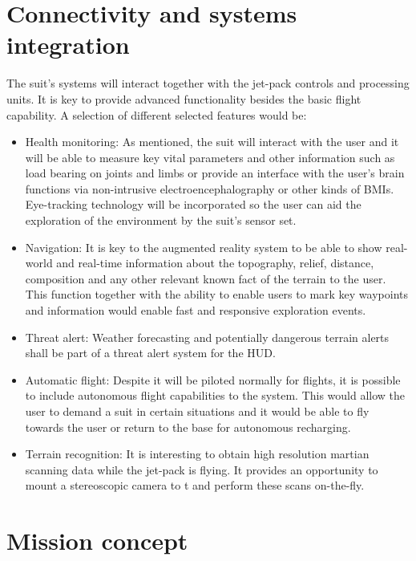 \documentclass[twocolumn]{article}
\begin{document}
\section{Connectivity and systems integration}

The suit's systems will interact together with the jet-pack controls and 
processing units. It is key to provide advanced functionality besides the basic 
flight capability. A selection of different selected features would be:
\begin{itemize}
	\item Health monitoring: As mentioned, the suit will interact with the 
user and it will be able to measure key vital parameters and other information 
such as load bearing on joints and limbs or provide an interface with the 
user's brain functions via non-intrusive electroencephalography or other kinds 
of BMIs. Eye-tracking technology will be incorporated so the user can aid the 
exploration of the environment by the suit's sensor set.
	\item Navigation: It is key to the augmented reality system to be able 
to show real-world and real-time information about the topography, relief, 
distance, composition and any other relevant known fact of the terrain to the 
user. This function together with the ability to enable users to mark key 
waypoints and information would enable fast and responsive exploration events.
	\item Threat alert: Weather forecasting and potentially dangerous 
terrain alerts shall be part of a threat alert system for the HUD.
	\item Automatic flight: Despite it will be piloted normally for 
flights, it is possible to include autonomous flight capabilities to the system. 
This would allow the user to demand a suit in certain situations and it would be 
able to fly towards the user or return to the base for autonomous recharging.
	\item Terrain recognition: It is interesting to obtain high resolution 
martian scanning data while the jet-pack is flying. It provides an opportunity 
to mount a stereoscopic camera to t and perform these scans on-the-fly.
\end{itemize}

\section{Mission concept}
\end{document}
